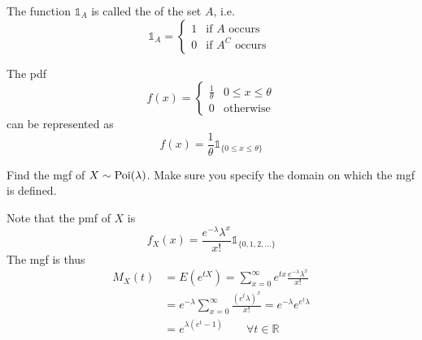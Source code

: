 \documentclass[notoc,notitlepage]{tufte-book}
\begin{document}
\begin{defn}
\label{defn:indicator_function}
  The function $\mathbb{1}_A$ is called the  of the set $A$, i.e.
  \begin{equation}\label{eq:indicator_function}
    \mathbb{1}_A = \begin{cases}
      1 & \text{if } A \text{ occurs } \\
      0 & \text{if } A^C \text{ occurs }
    \end{cases}
  \end{equation}
\end{defn}

\begin{eg}
  The pdf
  \begin{equation*}
    f(x) = \begin{cases}
      \frac{1}{\theta} & 0 \leq x \leq \theta \\
      0                & \text{otherwise}
    \end{cases}
  \end{equation*}
  can be represented as
  \begin{equation*}
    f(x) = \frac{1}{\theta} \mathbb{1}_{\{0 \leq x \leq \theta \}}
  \end{equation*}
\end{eg}

\begin{eg}[Example 2.26]
  Find the mgf of $X \sim \operatorname{Poi}(\lambda)$. Make sure you specify the domain on which the mgf is defined.

  \begin{solution}
    Note that the pmf of $X$ is
    \begin{equation*}
      f_X(x) = \frac{e^{-\lambda} \lambda^x}{x!} \mathbb{1}_{\{0, 1, 2, ...\}}
    \end{equation*}
    The mgf is thus
    \begin{align*}
      M_X(t) &= E(e^{tX}) = \sum_{x = 0}^{\infty} e^{tx} \frac{e^{-\lambda} \lambda^x}{x!} \\
             &= e^{-\lambda} \sum_{x = 0}^{\infty} \frac{(e^t \lambda)^x}{x!} = e^{-\lambda} e^{e^{t} \lambda} \\
             &= e^{\lambda( e^t - 1 )} \qquad \forall t \in \mathbb{R} 
    \end{align*}
  \end{solution}
\end{eg}
\end{document}
